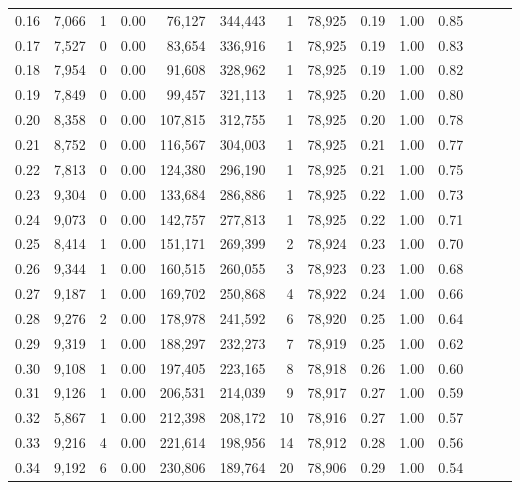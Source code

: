 \begin{tabular}{rrrrrrrrrrrrrr}
0.16 &  7,066 &      1 &  0.00 &   76,127 &  344,443 &       1 &  78,925 &  0.19 &  1.00 &      0.85 \\
0.17 &  7,527 &      0 &  0.00 &   83,654 &  336,916 &       1 &  78,925 &  0.19 &  1.00 &      0.83 \\
0.18 &  7,954 &      0 &  0.00 &   91,608 &  328,962 &       1 &  78,925 &  0.19 &  1.00 &      0.82 \\
0.19 &  7,849 &      0 &  0.00 &   99,457 &  321,113 &       1 &  78,925 &  0.20 &  1.00 &      0.80 \\
0.20 &  8,358 &      0 &  0.00 &  107,815 &  312,755 &       1 &  78,925 &  0.20 &  1.00 &      0.78 \\
0.21 &  8,752 &      0 &  0.00 &  116,567 &  304,003 &       1 &  78,925 &  0.21 &  1.00 &      0.77 \\
0.22 &  7,813 &      0 &  0.00 &  124,380 &  296,190 &       1 &  78,925 &  0.21 &  1.00 &      0.75 \\
0.23 &  9,304 &      0 &  0.00 &  133,684 &  286,886 &       1 &  78,925 &  0.22 &  1.00 &      0.73 \\
0.24 &  9,073 &      0 &  0.00 &  142,757 &  277,813 &       1 &  78,925 &  0.22 &  1.00 &      0.71 \\
0.25 &  8,414 &      1 &  0.00 &  151,171 &  269,399 &       2 &  78,924 &  0.23 &  1.00 &      0.70 \\
0.26 &  9,344 &      1 &  0.00 &  160,515 &  260,055 &       3 &  78,923 &  0.23 &  1.00 &      0.68 \\
0.27 &  9,187 &      1 &  0.00 &  169,702 &  250,868 &       4 &  78,922 &  0.24 &  1.00 &      0.66 \\
0.28 &  9,276 &      2 &  0.00 &  178,978 &  241,592 &       6 &  78,920 &  0.25 &  1.00 &      0.64 \\
0.29 &  9,319 &      1 &  0.00 &  188,297 &  232,273 &       7 &  78,919 &  0.25 &  1.00 &      0.62 \\
0.30 &  9,108 &      1 &  0.00 &  197,405 &  223,165 &       8 &  78,918 &  0.26 &  1.00 &      0.60 \\
0.31 &  9,126 &      1 &  0.00 &  206,531 &  214,039 &       9 &  78,917 &  0.27 &  1.00 &      0.59 \\
0.32 &  5,867 &      1 &  0.00 &  212,398 &  208,172 &      10 &  78,916 &  0.27 &  1.00 &      0.57 \\
0.33 &  9,216 &      4 &  0.00 &  221,614 &  198,956 &      14 &  78,912 &  0.28 &  1.00 &      0.56 \\
0.34 &  9,192 &      6 &  0.00 &  230,806 &  189,764 &      20 &  78,906 &  0.29 &  1.00 &      0.54 \\

\end{tabular}
